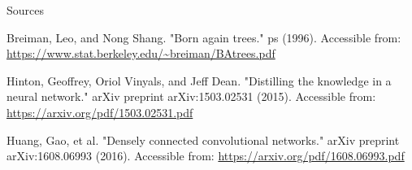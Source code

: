 \documentclass{beamer}
\begin{document}
\begin{frame}{Sources}

\begin{thebibliography}{0}
   Breiman, Leo, and Nong Shang. "Born again trees." ps (1996). Accessible from: \url{https://www.stat.berkeley.edu/~breiman/BAtrees.pdf}
  
   Hinton, Geoffrey, Oriol Vinyals, and Jeff Dean. "Distilling the knowledge in a neural network." arXiv preprint arXiv:1503.02531 (2015). Accessible from: \url{https://arxiv.org/pdf/1503.02531.pdf}
  
   Huang, Gao, et al. "Densely connected convolutional networks." arXiv preprint arXiv:1608.06993 (2016). Accessible from: \url{https://arxiv.org/pdf/1608.06993.pdf}
  
\end{thebibliography}

\end{frame}
 
 
 
\end{document}
